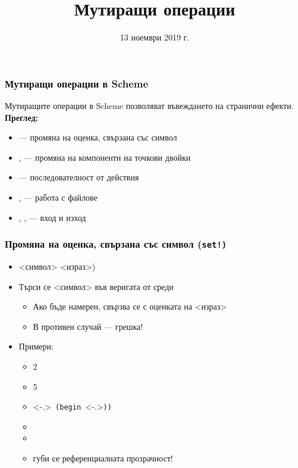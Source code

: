 \documentclass[alsotrans]{beamerswitch}
\title{Мутиращи операции}
\date{13 ноември 2019 г.}
\begin{document}
\begin{frame}
  \titlepage
\end{frame}

\begin{frame}
  \frametitle{Мутиращи операции в Scheme}

  Мутиращите операции в Scheme позволяват въвеждането на \alert{странични ефекти}.\\[4ex]
  \pause
  \textbf{Преглед:}
  \begin{itemize}[<+->]
  \item {} --- промяна на оценка, свързана със символ
  \item {},  --- промяна на компоненти на точкови двойки
  \item {} --- последователност от действия
  \item {},  --- работа с файлове
  \item {}, ,  --- вход и изход
  \end{itemize}
\end{frame}

\begin{frame}[fragile]
  \frametitle{Промяна на оценка, свързана със символ (\tt{set!})}

  \begin{itemize}[<+->]
  \item {} <символ> <израз>\tta)
  \item Търси се <символ> във веригата от среди
    \begin{itemize}
    \item Ако бъде намерен, свързва се с оценката на <израз>
    \item В противен случай --- \alert{грешка!}
    \end{itemize}
  \item Примери:
    \begin{itemize}
    \item {}\hspace{3em}2
    \item {}\hspace{4em}5
    \item {}\only<-.>{\tt{ (begin }}\only<-.>{\tt)}\tt)\pause
    \item {}
    \item {}
    \item \alert{губи се референциалната прозрачност!}
    \end{itemize}
  \end{itemize}
\end{frame}
\end{document}
